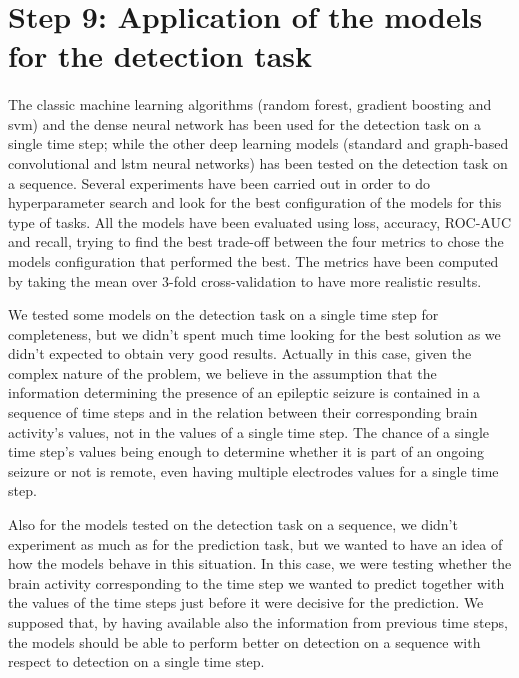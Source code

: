 \section{Step 9: Application of the models for the detection task} \label{sec: step_models_detection_task}
\paragraph{} The classic machine learning algorithms (random forest, gradient boosting and \acs{svm}) and the dense neural network has been used for the detection task on a single time step; while the other deep learning models (standard and graph-based convolutional and \acs{lstm} neural networks) has been tested on the detection task on a sequence. Several experiments have been carried out in order to do hyperparameter search and look for the best configuration of the models for this type of tasks. All the models have been evaluated using loss, accuracy, ROC-AUC and recall, trying to find the best trade-off between the four metrics to chose the models configuration that performed the best. The metrics have been computed by taking the mean over 3-fold cross-validation to have more realistic results.

We tested some models on the detection task on a single time step for completeness, but we didn't spent much time looking for the best solution as we didn't expected to obtain very good results. Actually in this case, given the complex nature of the problem, we believe in the assumption that the information determining the presence of an epileptic seizure is contained in a sequence of time steps and in the relation between their corresponding brain activity's values, not in the values of a single time step. The chance of a single time step's values being enough to determine whether it is part of an ongoing seizure or not is remote, even having multiple electrodes values for a single time step. 

Also for the models tested on the detection task on a sequence, we didn't experiment as much as for the prediction task, but we wanted to have an idea of how the models behave in this situation. In this case, we were testing whether the brain activity corresponding to the time step we wanted to predict together with the values of the time steps just before it were decisive for the prediction. We supposed that, by having available also the information from previous time steps, the models should be able to perform better on detection on a sequence with respect to detection on a single time step.

